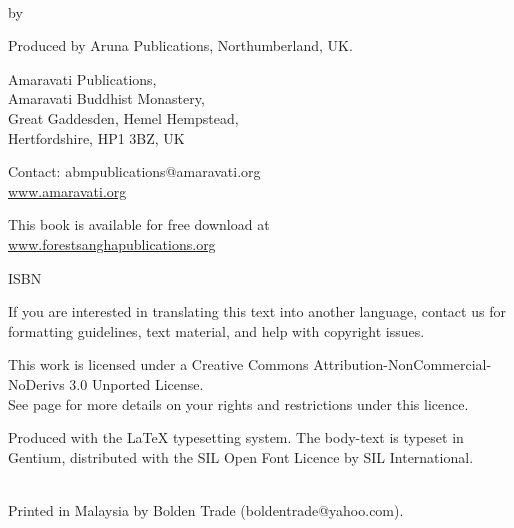 {\setlength{\parskip}{0.5em}\setlength{\parindent}{0em}%
\footnotesize
{\raggedright%

\thetitle\\
by \theauthor

Produced by Aruna Publications, Northumberland, UK.

\copyrightText

Amaravati Publications,\\
Amaravati Buddhist Monastery,\\
Great Gaddesden, Hemel Hempstead,\\
Hertfordshire, HP1 3BZ, UK

Contact: abmpublications@amaravati.org\\
\href{http://amaravati.org}{www.amaravati.org}

This book is available for free download at\\
\href{http://forestsanghapublications.org/}{www.forestsanghapublications.org}

ISBN \theISBN

If you are interested in translating this text into another language, contact us for formatting guidelines, text material, and help with copyright issues.

This work is licensed under a Creative Commons Attribution-NonCommercial-NoDerivs 3.0 Unported License.\\
See page \pageref{copyright-details} for more details on your rights and restrictions under this licence.

Produced with the {\selectfont\LaTeX} typesetting system. The body-text is typeset in Gentium, distributed with the SIL Open Font Licence by SIL International.

\theEditionInfo\\
Printed in Malaysia by Bolden Trade (boldentrade@yahoo.com).

}}

